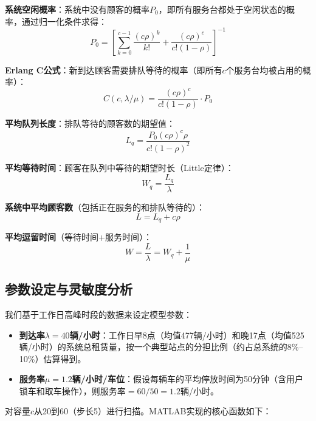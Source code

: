 \documentclass[12pt,a4paper]{article}
\begin{document}
\textbf{系统空闲概率}：系统中没有顾客的概率$P_0$，即所有服务台都处于空闲状态的概率，通过归一化条件求得：
\begin{equation}
P_0 = \left[ \sum_{k=0}^{c-1} \frac{(c\rho)^k}{k!} + \frac{(c\rho)^c}{c!(1-\rho)} \right]^{-1}
\label{eq:p0}
\end{equation}

\textbf{Erlang C公式}：新到达顾客需要排队等待的概率（即所有$c$个服务台均被占用的概率）：
\begin{equation}
C(c, \lambda/\mu) = \frac{(c\rho)^c}{c!(1-\rho)} \cdot P_0
\label{eq:erlangc}
\end{equation}

\textbf{平均队列长度}：排队等待的顾客数的期望值：
\begin{equation}
L_q = \frac{P_0 (c\rho)^c \rho}{c! (1-\rho)^2}
\label{eq:lq}
\end{equation}

\textbf{平均等待时间}：顾客在队列中等待的期望时长（Little定律）：
\begin{equation}
W_q = \frac{L_q}{\lambda}
\label{eq:wq}
\end{equation}

\textbf{系统中平均顾客数}（包括正在服务的和排队等待的）：
\begin{equation}
L = L_q + c\rho
\label{eq:l}
\end{equation}

\textbf{平均逗留时间}（等待时间+服务时间）：
\begin{equation}
W = \frac{L}{\lambda} = W_q + \frac{1}{\mu}
\label{eq:w}
\end{equation}

\subsection{参数设定与灵敏度分析}

我们基于工作日高峰时段的数据来设定模型参数：
\begin{itemize}
  \item \textbf{到达率$\lambda = 40$辆/小时}：工作日早8点（均值477辆/小时）和晚17点（均值525辆/小时）的系统总租赁量，按一个典型站点的分担比例（约占总系统的8\%--10\%）估算得到。
  \item \textbf{服务率$\mu = 1.2$辆/小时/车位}：假设每辆车的平均停放时间为50分钟（含用户锁车和取车操作），则服务率$= 60/50 = 1.2$辆/小时。
\end{itemize}

对容量$c$从20到60（步长5）进行扫描。MATLAB实现的核心函数如下：
\end{document}
